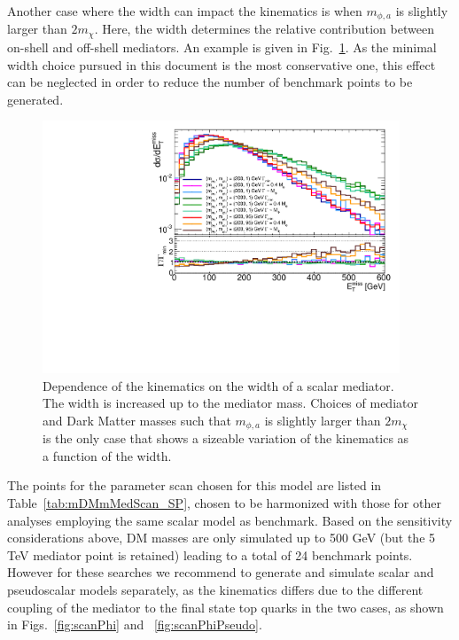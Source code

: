 Another case where the width can impact the kinematics is when $m_{\phi,a}$ is slightly larger than $2m_\chi$. Here, the width determines the relative contribution between on-shell and off-shell mediators. An example is given in Fig.~\ref{fig:widthlargescan}. As the minimal width choice pursued in this document is the most conservative one, this effect can be neglected in order to reduce the number of benchmark points to be generated. 


\begin{figure}[!ht]
  \begin{center}
    \includegraphics[width=0.95\textwidth]{figures/ttbar/ScalarWidth.pdf}
    \vspace{2mm}
    \caption{\label{fig:widthlargescan} Dependence of the kinematics on the width of a scalar mediator. The width is increased up to the mediator mass. Choices of mediator and Dark Matter masses such that $m_{\phi,a}$ is slightly larger than $2m_\chi$ is the only case that shows a sizeable variation of the kinematics as a function of the width.  
    }
\end{center}
\end{figure}

The points for the parameter scan chosen for this model are listed in Table~\ref{tab:mDMmMedScan_SP}, chosen
to be harmonized with those for other analyses employing the same scalar model as benchmark. 
Based on the sensitivity considerations above, DM masses are only simulated up to 500 GeV (but the 5 TeV mediator point is retained)
leading to a total of 24 benchmark points. However for these searches we recommend to generate and simulate scalar and pseudoscalar
models separately, as the kinematics differs due to the different coupling of the mediator to the final state top quarks in the two cases,
as shown in Figs.~\ref{fig:scanPhi} and ~\ref{fig:scanPhiPseudo}.

